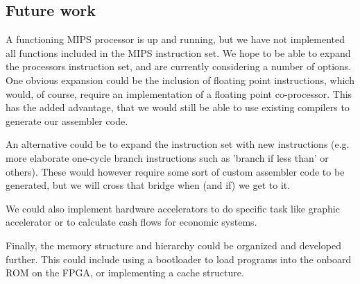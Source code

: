 
\subsection{Future work} \label{sec:future}

A functioning MIPS processor is up and running, but we have not implemented all functions included in the MIPS instruction set. We hope to be able to expand the processors instruction set, and are currently considering a number of options. One obvious expansion could be the inclusion of floating point instructions, which would, of course, require an implementation of a floating point co-processor. This has the added advantage, that we would still be able to use existing compilers to generate our assembler code.

An alternative could be to expand the instruction set with new instructions (e.g. more elaborate one-cycle branch instructions such as 'branch if less than' or others). These would however require some sort of custom assembler code to be generated, but we will cross that bridge when (and if) we get to it. 

We could also implement hardware accelerators to do specific task like graphic accelerator or to calculate cash flows for economic systems. 

Finally, the memory structure and hierarchy could be organized and developed further. This could include using a bootloader to load programs into the onboard ROM on the FPGA, or implementing a cache structure.
